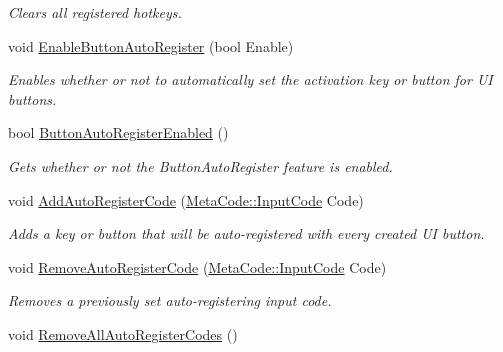 \begin{DoxyCompactItemize}
\begin{DoxyCompactList}\small\item\em Clears all registered hotkeys. \item\end{DoxyCompactList}\item 
void \hyperlink{classphys_1_1UIManager_a210e1607f0fa63aa44a1f7a6b4156f60}{EnableButtonAutoRegister} (bool Enable)
\begin{DoxyCompactList}\small\item\em Enables whether or not to automatically set the activation key or button for UI buttons. \item\end{DoxyCompactList}\item 
bool \hyperlink{classphys_1_1UIManager_aa55bfb557af6569914662e3786b86a7a}{ButtonAutoRegisterEnabled} ()
\begin{DoxyCompactList}\small\item\em Gets whether or not the ButtonAutoRegister feature is enabled. \item\end{DoxyCompactList}\item 
void \hyperlink{classphys_1_1UIManager_ac44c38c26dece8a5d2087cb9ab2eac15}{AddAutoRegisterCode} (\hyperlink{classphys_1_1MetaCode_a3e501cbb5bf0f6f1fdb7211465bda8d8}{MetaCode::InputCode} Code)
\begin{DoxyCompactList}\small\item\em Adds a key or button that will be auto-\/registered with every created UI button. \item\end{DoxyCompactList}\item 
void \hyperlink{classphys_1_1UIManager_a0335a3ee8134edf514222896790a71d1}{RemoveAutoRegisterCode} (\hyperlink{classphys_1_1MetaCode_a3e501cbb5bf0f6f1fdb7211465bda8d8}{MetaCode::InputCode} Code)
\begin{DoxyCompactList}\small\item\em Removes a previously set auto-\/registering input code. \item\end{DoxyCompactList}\item 
\hypertarget{classphys_1_1UIManager_a006ae9f06562877b0a7fe315c25d96a0}{
void \hyperlink{classphys_1_1UIManager_a006ae9f06562877b0a7fe315c25d96a0}{RemoveAllAutoRegisterCodes} ()}
\label{d5/dc5/classphys_1_1UIManager_a006ae9f06562877b0a7fe315c25d96a0}


\end{DoxyCompactItemize}
